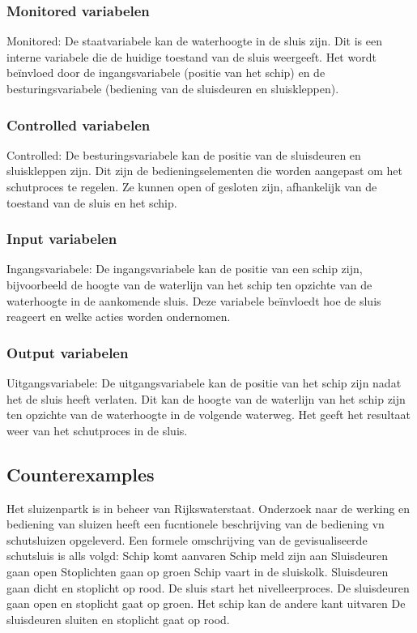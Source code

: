 \documentclass{article}
\begin{document}
	\subsubsection{Monitored variabelen}
	Monitored: De staatvariabele kan de waterhoogte in de sluis zijn. Dit is een interne variabele die de huidige toestand van de sluis weergeeft. Het wordt beïnvloed door de ingangsvariabele (positie van het schip) en de besturingsvariabele (bediening van de sluisdeuren en sluiskleppen).
	\subsubsection{Controlled variabelen}
		Controlled: De besturingsvariabele kan de positie van de sluisdeuren en sluiskleppen zijn. Dit zijn de bedieningselementen die worden aangepast om het schutproces te regelen. Ze kunnen open of gesloten zijn, afhankelijk van de toestand van de sluis en het schip.
	\subsubsection{Input variabelen}
	Ingangsvariabele: De ingangsvariabele kan de positie van een schip zijn, bijvoorbeeld de hoogte van de waterlijn van het schip ten opzichte van de waterhoogte in de aankomende sluis. Deze variabele beïnvloedt hoe de sluis reageert en welke acties worden ondernomen.
	\subsubsection{Output variabelen}
	Uitgangsvariabele: De uitgangsvariabele kan de positie van het schip zijn nadat het de sluis heeft verlaten. Dit kan de hoogte van de waterlijn van het schip zijn ten opzichte van de waterhoogte in de volgende waterweg. Het geeft het resultaat weer van het schutproces in de sluis.

	
	
	
	
	\subsection{Counterexamples}
	Het sluizenpartk is in beheer van Rijkswaterstaat. Onderzoek naar de werking en bediening van  sluizen
	heeft een fucntionele beschrijving van de bediening vn schutsluizen opgeleverd. Een formele omschrijving van de gevisualiseerde schutsluis is alls volgd:
	Schip komt aanvaren
	Schip meld zijn aan
	Sluisdeuren gaan open
	Stoplichten gaan op groen
	Schip vaart in de sluiskolk.
	Sluisdeuren gaan dicht en stoplicht op rood.
	De sluis start het nivelleerproces.
	De sluisdeuren  gaan open en stoplicht gaat op groen.
	Het schip kan de andere kant uitvaren
	De sluisdeuren sluiten en stoplicht gaat op rood.
\end{document}
